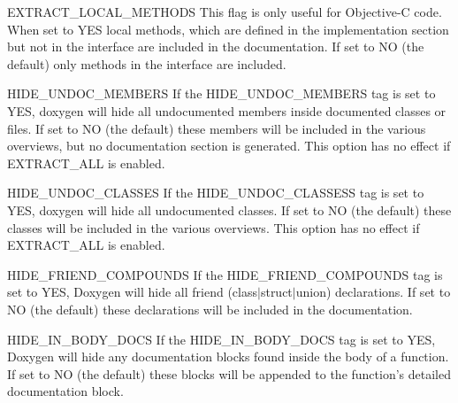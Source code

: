 \begin{DoxyDescription}
\label{config_cfg_extract_local_methods}
\hypertarget{config_cfg_extract_local_methods}{}
 
\item[{\ttfamily EXTRACT\_\-LOCAL\_\-METHODS} ] This flag is only useful for Objective-\/C code. When set to {\ttfamily YES} local methods, which are defined in the implementation section but not in the interface are included in the documentation. If set to {\ttfamily NO} (the default) only methods in the interface are included.

\label{config_cfg_hide_undoc_members}
\hypertarget{config_cfg_hide_undoc_members}{}
 
\item[{\ttfamily HIDE\_\-UNDOC\_\-MEMBERS} ] If the {\ttfamily HIDE\_\-UNDOC\_\-MEMBERS} tag is set to {\ttfamily YES}, doxygen will hide all undocumented members inside documented classes or files. If set to {\ttfamily NO} (the default) these members will be included in the various overviews, but no documentation section is generated. This option has no effect if {\ttfamily EXTRACT\_\-ALL} is enabled.

\label{config_cfg_hide_undoc_classes}
\hypertarget{config_cfg_hide_undoc_classes}{}
 
\item[{\ttfamily HIDE\_\-UNDOC\_\-CLASSES} ] If the {\ttfamily HIDE\_\-UNDOC\_\-CLASSESS} tag is set to {\ttfamily YES}, doxygen will hide all undocumented classes. If set to {\ttfamily NO} (the default) these classes will be included in the various overviews. This option has no effect if {\ttfamily EXTRACT\_\-ALL} is enabled.

\label{config_cfg_hide_friend_compounds}
\hypertarget{config_cfg_hide_friend_compounds}{}
 
\item[{\ttfamily HIDE\_\-FRIEND\_\-COMPOUNDS} ] If the {\ttfamily HIDE\_\-FRIEND\_\-COMPOUNDS} tag is set to {\ttfamily YES}, Doxygen will hide all friend (class$|$struct$|$union) declarations. If set to {\ttfamily NO} (the default) these declarations will be included in the documentation.

\label{config_cfg_hide_in_body_docs}
\hypertarget{config_cfg_hide_in_body_docs}{}
 
\item[{\ttfamily HIDE\_\-IN\_\-BODY\_\-DOCS} ] If the {\ttfamily HIDE\_\-IN\_\-BODY\_\-DOCS} tag is set to {\ttfamily YES}, Doxygen will hide any documentation blocks found inside the body of a function. If set to {\ttfamily NO} (the default) these blocks will be appended to the function's detailed documentation block.


\end{DoxyDescription}
